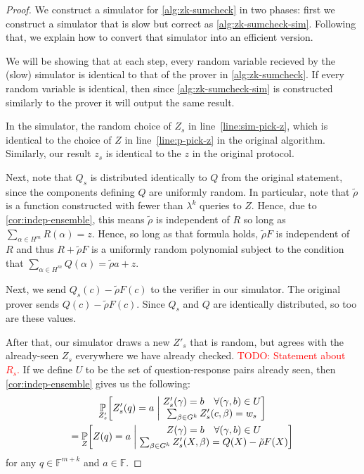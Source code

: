 \documentclass[english,12pt]{reedthesis}
\theoremstyle{plain}
\theoremstyle{definition}
\theoremstyle{remark}
\newcommand{\middlemid}{%
  \ensuremath{\;\middle\vert\;}
}
\newcommand{\TODO}[1]{\textcolor{red}{TODO: #1}}
\begin{document}
\begin{proof}
  We construct a simulator for \cref{alg:zk-sumcheck} in two phases: first we
  construct a simulator that is slow but correct as \cref{alg:zk-sumcheck-sim}.
  Following that, we explain how to convert that simulator into an efficient
  version.

  We will be showing that at each step, every random variable recieved by the
  (slow) simulator is identical to that of the prover in \cref{alg:zk-sumcheck}.
  If every random variable is identical, then since \cref{alg:zk-sumcheck-sim}
  is constructed similarly to the prover it will output the same result.

  In the simulator, the random choice of $Z_{s}$ in line~\ref{line:sim-pick-z},
  which is identical to the choice of $Z$ in line~\ref{line:p-pick-z} in the
  original algorithm. Similarly, our result $z_{s}$ is identical to the $z$ in
  the original protocol.

  Next, note that $Q_{s}$ is distributed identically to $Q$ from the original
  statement, since the components defining $Q$ are uniformly random. In
  particular, note that $\tilde{\rho}$ is a function constructed with fewer than
  $\lambda^{k}$ queries to $Z$. Hence, due to \cref{cor:indep-ensemble}, this means
  $\tilde{\rho}$ is independent of $R$ so long as $\sum_{\alpha \in H^{m}}R(\alpha) = z$. Hence,
  so long as that formula holds, $\tilde{\rho}F$ is independent of $R$ and thus
  $R + \tilde{\rho}F$ is a uniformly random polynomial subject to the condition
  that $\sum_{\alpha \in H^{m}}Q(\alpha) = \tilde{\rho}a + z$.

  Next, we send $Q_{s}(c) - \tilde{\rho}F(c)$ to the verifier in our simulator. The
  original prover sends $Q(c) - \tilde{\rho}F(c)$. Since $Q_{s}$ and $Q$ are
  identically distributed, so too are these values.

  After that, our simulator draws a new $Z'_{s}$ that is random, but agrees
  with the already-seen $Z_{s}$ everywhere we have already checked.
  \TODO{Statement about $R_{s}$.} If we define $U$ to be the set of
  question-response pairs already seen, then \cref{cor:indep-ensemble} gives us
  the following:
  \begin{multline}\label{eqn:z-query-dist}
    \underset{Z'_{s}}{\mathbb{P}}\mleft[
      Z'_{s}(q) = a \middlemid
      \begin{matrix}
        Z'_{s}(\gamma) = b \quad \forall (\gamma, b) \in U \\
        \sum_{\beta \in G^{k}}Z'_{s}(c, \beta) = w_{s}
      \end{matrix}
    \mright] \\
    = \underset{Z}{\mathbb{P}}\mleft[
      Z(q) = a \middlemid
      \begin{matrix}
        Z(\gamma) = b \quad \forall (\gamma, b) \in U \\
        \sum_{\beta \in G^{k}}Z'_{s}(X, \beta) = Q(X) - \tilde{\rho}F(X)
      \end{matrix}
    \mright]
  \end{multline}
  for any $q \in \mathbb{F}^{m+k}$ and $a \in \mathbb{F}$.


\end{proof}
\end{document}
